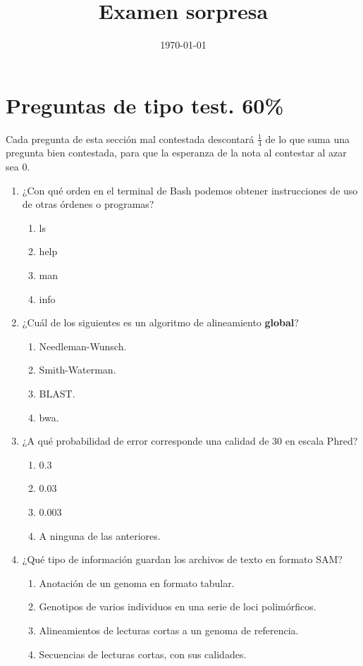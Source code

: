\documentclass[a4paper,12pt]{article}
\title{Examen sorpresa}
\date{\today}
\begin{document}
\maketitle

\section*{Preguntas de tipo test. 60\%}
Cada pregunta de esta sección mal contestada descontará $\frac{1}{4}$ de lo que
suma una pregunta bien contestada, para que la esperanza de la nota al contestar
al azar sea 0.

\begin{enumerate}
\item ¿Con qué orden en el terminal de Bash podemos obtener instrucciones de uso de
      otras órdenes o programas?
   \begin{enumerate}
   \item \textsf{ls}
   \item \textsf{help}
   \item \textsf{man}
   \item \textsf{info}
   \end{enumerate}

\item ¿Cuál de los siguientes es un algoritmo de alineamiento \textbf{global}?
   \begin{enumerate}
   \item Needleman-Wunsch.
   \item Smith-Waterman.
   \item BLAST.
   \item bwa.
   \end{enumerate}

\item ¿A qué probabilidad de error corresponde una calidad de 30 en escala Phred?
   \begin{enumerate}
   \item 0.3 
   \item 0.03
   \item 0.003
   \item A ninguna de las anteriores.
   \end{enumerate}

\item ¿Qué tipo de información guardan los archivos de texto en formato SAM?
   \begin{enumerate}
   \item Anotación de un genoma en formato tabular.
   \item Genotipos de varios individuos en una serie de loci polimórficos.
   \item Alineamientos de lecturas cortas a un genoma de referencia.
   \item Secuencias de lecturas cortas, con sus calidades.
   \end{enumerate}


\end{enumerate}
\end{document}
